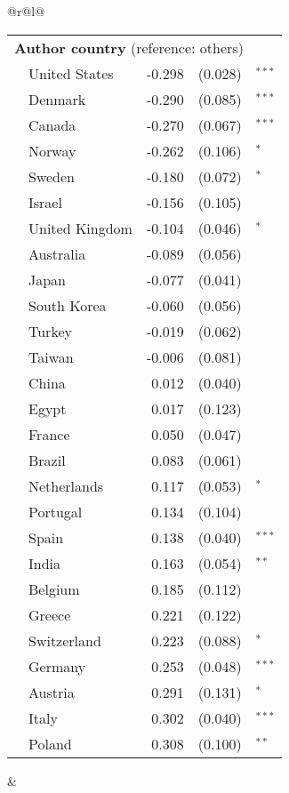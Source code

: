 
\begin{tabular}{@{}r@{}l@{}}

\begin{tabular}[t]{@{}ll@{ }r@{ }l@{}l@{}}
\multicolumn{5}{l}{\textbf{Author country} (reference: others)} \\
 & United States & -0.298 & (0.028) & $^{***}$ \\
 & Denmark & -0.290 & (0.085) & $^{***}$ \\
 & Canada & -0.270 & (0.067) & $^{***}$ \\
 & Norway & -0.262 & (0.106) & $^{*}$ \\
 & Sweden & -0.180 & (0.072) & $^{*}$ \\
 & Israel & -0.156 & (0.105) & $^{}$ \\
 & United Kingdom & -0.104 & (0.046) & $^{*}$ \\
 & Australia & -0.089 & (0.056) & $^{}$ \\
 & Japan & -0.077 & (0.041) & $^{}$ \\
 & South Korea & -0.060 & (0.056) & $^{}$ \\
 & Turkey & -0.019 & (0.062) & $^{}$ \\
 & Taiwan & -0.006 & (0.081) & $^{}$ \\
 & China & 0.012 & (0.040) & $^{}$ \\
 & Egypt & 0.017 & (0.123) & $^{}$ \\
 & France & 0.050 & (0.047) & $^{}$ \\
 & Brazil & 0.083 & (0.061) & $^{}$ \\
 & Netherlands & 0.117 & (0.053) & $^{*}$ \\
 & Portugal & 0.134 & (0.104) & $^{}$ \\
 & Spain & 0.138 & (0.040) & $^{***}$ \\
 & India & 0.163 & (0.054) & $^{**}$ \\
 & Belgium & 0.185 & (0.112) & $^{}$ \\
 & Greece & 0.221 & (0.122) & $^{}$ \\
 & Switzerland & 0.223 & (0.088) & $^{*}$ \\
 & Germany & 0.253 & (0.048) & $^{***}$ \\
 & Austria & 0.291 & (0.131) & $^{*}$ \\
 & Italy & 0.302 & (0.040) & $^{***}$ \\
 & Poland & 0.308 & (0.100) & $^{**}$ \\ 
[.05in]
\iffalse
\midrule 
\multicolumn{5}{l}{\footnotesize{$^{***}p<0.001$; $^{**}p<0.01$; $^{*}p<0.05$}} \\ [.02in]
\fi
\end{tabular}
&


\end{tabular}
